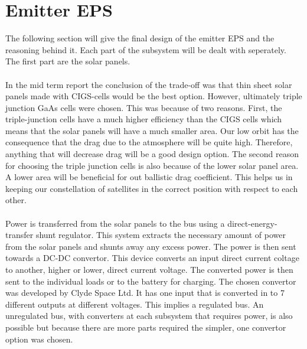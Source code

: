 \section{Emitter EPS}
\label{emitter_EPS}

The following section will give the final design of the emitter EPS and the reasoning behind it.
Each part of the subsystem will be dealt with seperately. The first part are the solar panels.
\\\\
In the mid term report the conclusion of the trade-off was that thin sheet solar panels made with CIGS-cells would be the best option. However, ultimately triple junction GaAs cells were chosen. This was because of two reasons. First, the triple-junction cells have a much higher efficiency than the CIGS cells which means that the solar panels will have a much smaller area. Our low orbit has the consequence that the drag due to the atmosphere will be quite high. Therefore, anything that will decrease drag will be a good design option. The second reason for choosing the triple junction cells is also because of the lower solar panel area. A lower area will be beneficial for out ballistic drag coefficient. This helps us in keeping our constellation of satellites in the correct position with respect to each other.
\\\\
Power is transferred from the solar panels to the bus using a direct-energy-transfer shunt regulator. This system extracts the necessary amount of power from the solar panels and shunts away any excess power. The power is then sent towards a DC-DC convertor. This device converts an input direct current coltage to another, higher or lower, direct current voltage. The converted power is then sent to the individual loads or to the battery for charging. The chosen convertor was developed by Clyde Space Ltd. It has one input that is converted in to 7 different outputs at different voltages. This implies a regulated bus. An unregulated bus, with converters at each subsystem that requires power, is also possible but because there are more parts required the simpler, one convertor option was chosen.
\\\\
